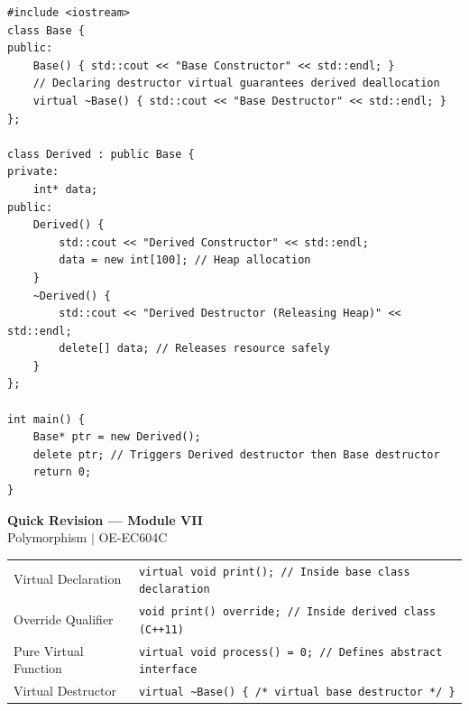 \documentclass[12pt,a4paper]{article}
\renewcommand{\arraystretch}{1.45}
\begin{document}
\begin{tcolorbox}[examplebox, title={Code Example: Memory leak prevention via Virtual Destructors}]
\begin{spacing}{1.0}
\begin{verbatim}
#include <iostream>
class Base {
public:
    Base() { std::cout << "Base Constructor" << std::endl; }
    // Declaring destructor virtual guarantees derived deallocation
    virtual ~Base() { std::cout << "Base Destructor" << std::endl; }
};

class Derived : public Base {
private:
    int* data;
public:
    Derived() {
        std::cout << "Derived Constructor" << std::endl;
        data = new int[100]; // Heap allocation
    }
    ~Derived() {
        std::cout << "Derived Destructor (Releasing Heap)" << std::endl;
        delete[] data; // Releases resource safely
    }
};

int main() {
    Base* ptr = new Derived();
    delete ptr; // Triggers Derived destructor then Base destructor
    return 0;
}
\end{verbatim}
\end{spacing}
\end{tcolorbox}

\newpage
\begin{center}
  {\large\bfseries\color{myred} Quick Revision --- Module VII}\\[3pt]
  {\small\color{mydark} Polymorphism $|$ OE-EC604C}
\end{center}
\noindent{\color{myred}\rule{\linewidth}{1.2pt}}
\vspace{4pt}

\begin{tcolorbox}[formulabox, title={\textbf{Key Polymorphic Syntax}}]
\renewcommand{\arraystretch}{1.3}
\begin{tabularx}{\linewidth}{B{3.8cm} X}
Virtual Declaration      & \texttt{virtual void print(); // Inside base class declaration} \\[4pt]
Override Qualifier       & \texttt{void print() override; // Inside derived class (C++11)} \\[4pt]
Pure Virtual Function    & \texttt{virtual void process() = 0; // Defines abstract interface} \\[4pt]
Virtual Destructor       & \texttt{virtual \textasciitilde Base() \{ /* virtual base destructor */ \}}
\end{tabularx}
\end{tcolorbox}
\end{document}
